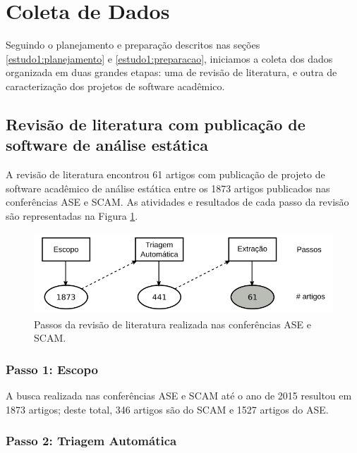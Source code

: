 \section{Coleta de Dados} \label{estudo1:coleta} %

Seguindo o planejamento e preparação descritos nas seções
\ref{estudo1:planejamento} e \ref{estudo1:preparacao}, iniciamos a coleta dos
dados organizada em duas grandes etapas: uma de revisão de literatura, e outra
de caracterização dos projetos de software acadêmico.

\subsection{Revisão de literatura com publicação de software de análise estática}

A revisão de literatura encontrou 61 artigos com publicação de projeto de
software acadêmico de análise estática entre os 1873 artigos publicados nas
conferências ASE e SCAM. As atividades e resultados de cada passo da revisão
são representadas na Figura \ref{revisao-literatura}.

\begin{figure}[h]
  \center
  \includegraphics[scale=0.4]{imagens/revisao-literatura.png}
  \caption{Passos da revisão de literatura realizada nas conferências ASE e SCAM.}
  \label{revisao-literatura}
\end{figure}

\subsubsection{Passo 1: Escopo}

A busca realizada nas conferências ASE e SCAM até o ano de 2015 resultou em
1873 artigos; deste total, 346 artigos são do SCAM e 1527 artigos do ASE.

\subsubsection{Passo 2: Triagem Automática}

